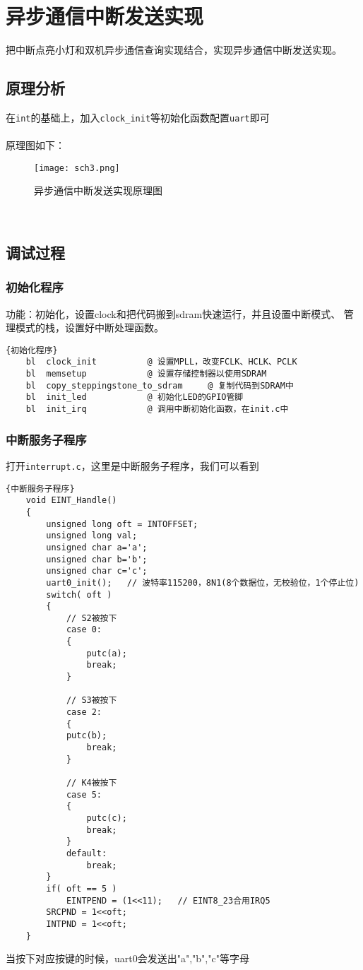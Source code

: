 \section{异步通信中断发送实现}
把中断点亮小灯和双机异步通信查询实现结合，实现异步通信中断发送实现。
\subsection{原理分析}
在\lstinline{int}的基础上，加入\lstinline{clock_init}等初始化函数配置\lstinline{uart}即可\\
\\
原理图如下：\\
\begin{figure}[htbp]
  \centering
  \texttt{[image: sch3.png]}
  \caption{异步通信中断发送实现原理图}
\end{figure}
\\
\subsection{调试过程}
\subsubsection{初始化程序}
功能：初始化，设置clock和把代码搬到sdram快速运行，并且设置中断模式、
管理模式的栈，设置好中断处理函数。\\
\lstset{language=bash}
\begin{lstlisting}{初始化程序}
    bl  clock_init          @ 设置MPLL，改变FCLK、HCLK、PCLK
    bl  memsetup            @ 设置存储控制器以使用SDRAM
    bl  copy_steppingstone_to_sdram     @ 复制代码到SDRAM中
    bl  init_led            @ 初始化LED的GPIO管脚
    bl  init_irq            @ 调用中断初始化函数，在init.c中
\end{lstlisting}

\subsubsection{中断服务子程序}
打开\lstinline{interrupt.c}，这里是中断服务子程序，我们可以看到
\lstset{language=C}
\begin{lstlisting}{中断服务子程序}
    void EINT_Handle()
    {
        unsigned long oft = INTOFFSET;
        unsigned long val;
        unsigned char a='a';
        unsigned char b='b';
        unsigned char c='c';
        uart0_init();   // 波特率115200，8N1(8个数据位，无校验位，1个停止位)
        switch( oft )
        {
            // S2被按下
            case 0: 
            {   
                putc(a);
                break;
            }
            
            // S3被按下
            case 2:
            {   
            putc(b);
                break;
            }
    
            // K4被按下
            case 5:
            {   
                putc(c);             
                break;
            }
            default:
                break;
        }
        if( oft == 5 ) 
            EINTPEND = (1<<11);   // EINT8_23合用IRQ5
        SRCPND = 1<<oft;
        INTPND = 1<<oft;
    }
\end{lstlisting}
当按下对应按键的时候，uart0会发送出"a","b","c"等字母

